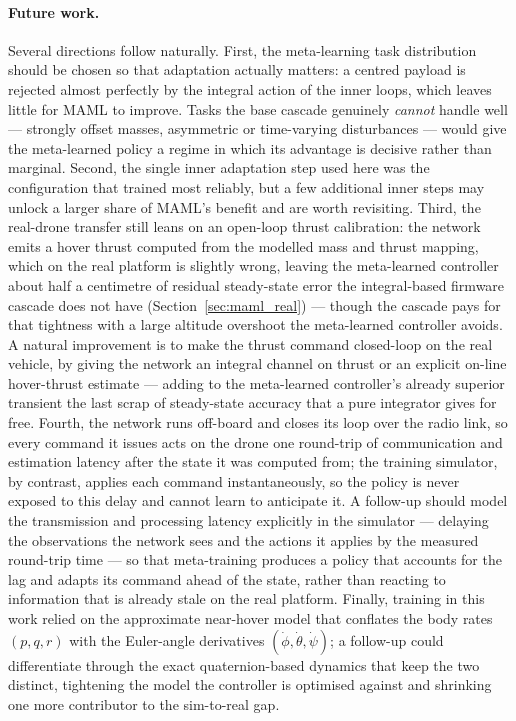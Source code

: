 \documentclass[11pt,a4paper]{article}
\theoremstyle{remark}
\numberwithin{equation}{section}
\begin{document}
\paragraph{Future work.}
Several directions follow naturally. First, the meta-learning task distribution
should be chosen so that adaptation actually matters: a centred payload is rejected
almost perfectly by the integral action of the inner loops, which leaves little for
MAML to improve. Tasks the base cascade genuinely \emph{cannot} handle well ---
strongly offset masses, asymmetric or time-varying disturbances --- would give the
meta-learned policy a regime in which its advantage is decisive rather than
marginal. Second, the single inner adaptation step used here was the configuration
that trained most reliably, but a few additional inner steps may unlock a larger
share of MAML's benefit and are worth revisiting. Third, the real-drone transfer
still leans on an open-loop thrust calibration: the network emits a hover thrust
computed from the modelled mass and thrust mapping, which on the real platform is
slightly wrong, leaving the meta-learned controller about half a centimetre of
residual steady-state error the integral-based firmware cascade does not have
(Section~\ref{sec:maml_real}) --- though the cascade pays for that tightness with a
large altitude overshoot the meta-learned controller avoids. A natural improvement
is to make the thrust command closed-loop on the real vehicle, by giving the
network an integral channel on thrust or an explicit on-line hover-thrust estimate
--- adding to the meta-learned controller's already superior transient the last
scrap of steady-state accuracy that a pure integrator gives for free. Fourth, the
network runs off-board and closes its loop over the radio link, so every command it
issues acts on the drone one round-trip of communication and estimation latency
after the state it was computed from; the training simulator, by contrast, applies
each command instantaneously, so the policy is never exposed to this delay and
cannot learn to anticipate it. A follow-up should model the transmission and
processing latency explicitly in the simulator --- delaying the observations the
network sees and the actions it applies by the measured round-trip time --- so that
meta-training produces a policy that accounts for the lag and adapts its command
ahead of the state, rather than reacting to information that is already stale on the
real platform. Finally,
training in this
work relied on the approximate near-hover model that conflates the body rates
$(p,q,r)$ with the Euler-angle derivatives $(\dot\phi,\dot\theta,\dot\psi)$; a
follow-up could differentiate through the exact quaternion-based dynamics that keep
the two distinct, tightening the model the controller is optimised against and
shrinking one more contributor to the sim-to-real gap.
\end{document}
